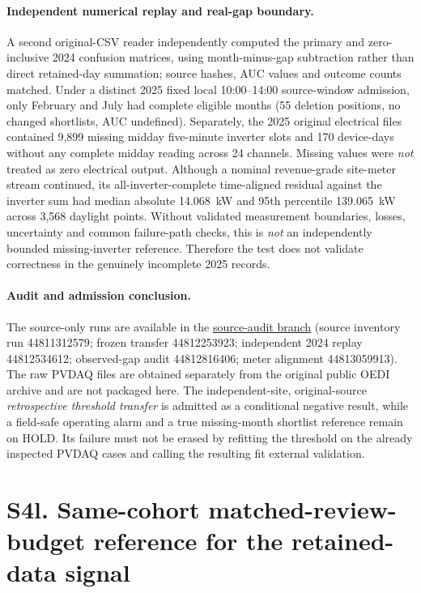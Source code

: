 \documentclass[11pt]{article}
\begin{document}
\paragraph{Independent numerical replay and real-gap boundary.} A second original-CSV reader independently computed the primary and zero-inclusive 2024 confusion matrices, using month-minus-gap subtraction rather than direct retained-day summation; source hashes, AUC values and outcome counts matched. Under a distinct 2025 fixed local 10:00--14:00 source-window admission, only February and July had complete eligible months (55 deletion positions, no changed shortlists, AUC undefined). Separately, the 2025 original electrical files contained 9,899 missing midday five-minute inverter slots and 170 device-days without any complete midday reading across 24 channels. Missing values were \emph{not} treated as zero electrical output. Although a nominal revenue-grade site-meter stream continued, its all-inverter-complete time-aligned residual against the inverter sum had median absolute 14.068~kW and 95th percentile 139.065~kW across 3,568 daylight points. Without validated measurement boundaries, losses, uncertainty and common failure-path checks, this is \emph{not} an independently bounded missing-inverter reference. Therefore the test does not validate correctness in the genuinely incomplete 2025 records.

\paragraph{Audit and admission conclusion.} The source-only runs are available in the \href{https://github.com/shaikhamalkawi-ux/pv-missing-day-decision-reliability/tree/r44-pvdaq2107-external-source-eligibility}{source-audit branch} (source inventory run 44811312579; frozen transfer 44812253923; independent 2024 replay 44812534612; observed-gap audit 44812816406; meter alignment 44813059913). The raw PVDAQ files are obtained separately from the original public OEDI archive and are not packaged here. The independent-site, original-source \emph{retrospective threshold transfer} is admitted as a conditional negative result, while a field-safe operating alarm and a true missing-month shortlist reference remain on HOLD. Its failure must not be erased by refitting the threshold on the already inspected PVDAQ cases and calling the resulting fit external validation.


\section*{S4l. Same-cohort matched-review-budget reference for the retained-data signal}
\end{document}
